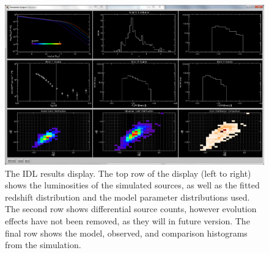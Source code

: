 \documentclass[twocolumn,letterpaper,10pt]{article}
\begin{document}
\begin{figure}
  \includegraphics[width=\textwidth]{bestfit2.png}
  \caption{The IDL results display. The top row of the display (left to right) shows the luminosities of the simulated sources, as well as the fitted redshift distribution and the model parameter distributions used. The second row shows differential source counts, however evolution effects have not been removed, as they will in future version. The final row shows the model, observed, and comparison histograms from the simulation.}
  \label{disp:res}
\end{figure}
\end{document}
